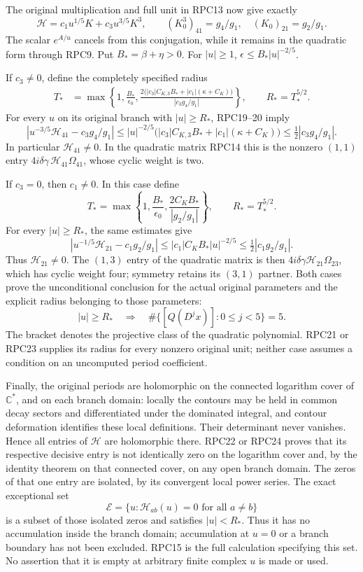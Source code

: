 \documentclass[11pt,a4paper]{article}
\begin{document}
The original multiplication and full unit in RPC13 now give exactly
\[
 \mathcal H=c_1u^{1/5}K+c_3u^{3/5}K^3,
 \qquad (K_0^3)_{41}=g_4/g_1,\quad (K_0)_{21}=g_2/g_1.
 \tag{RPC20}
\]
The scalar $e^{A/u}$ cancels from this conjugation, while it remains
in the quadratic form through RPC9. Put $B_*=\beta+\eta>0$.
For $|u|\ge1$, $\epsilon\le B_*|u|^{-2/5}$.

If $c_3\ne0$, define the completely specified radius
\[
 \begin{split}
 T_*&=\max\left\{1,\frac{B_*}{\epsilon_0},
 \frac{2\bigl(|c_3|C_{K,3}B_*+|c_1|(\kappa+C_K)\bigr)}
 {|c_3g_4/g_1|}\right\},\qquad R_*=T_*^{5/2}.
 \end{split}
 \tag{RPC21}
\]
For every $u$ on its original branch with $|u|\ge R_*$,
RPC19--20 imply
\[
 \left|u^{-3/5}\mathcal H_{41}-c_3g_4/g_1\right|
 \le |u|^{-2/5}\bigl(|c_3|C_{K,3}B_*
                           +|c_1|(\kappa+C_K)\bigr)
 \le\tfrac12|c_3g_4/g_1|.
 \tag{RPC22}
\]
In particular $\mathcal H_{41}\ne0$. In the quadratic matrix
RPC14 this is the nonzero $(1,1)$ entry
$4i\delta\gamma\,\mathcal H_{41}\Omega_{41}$, whose cyclic
weight is two.

If $c_3=0$, then $c_1\ne0$. In this case define
\[
 T_* =\max\left\{1,\frac{B_*}{\epsilon_0},
                   \frac{2C_KB_*}{|g_2/g_1|}\right\},
 \qquad R_*=T_*^{5/2}.
 \tag{RPC23}
\]
For every $|u|\ge R_*$, the same estimates give
\[
 \left|u^{-1/5}\mathcal H_{21}-c_1g_2/g_1\right|
       \le |c_1|C_KB_*|u|^{-2/5}
       \le\tfrac12|c_1g_2/g_1|.
 \tag{RPC24}
\]
Thus $\mathcal H_{21}\ne0$. The $(1,3)$ entry of the quadratic
matrix is then $4i\delta\gamma\mathcal H_{21}\Omega_{23}$,
which has cyclic weight four; symmetry retains its $(3,1)$ partner.
Both cases prove the unconditional conclusion for the actual original
parameters and the explicit radius belonging to those parameters:
\[
 \boxed{\quad |u|\ge R_*\quad\Longrightarrow\quad
       \#\{[Q(D^jx)]:0\le j<5\}=5.\quad}
 \tag{RPC25}
\]
The bracket denotes the projective class of the quadratic polynomial.
RPC21 or RPC23 supplies its radius for every nonzero original unit;
neither case assumes a condition on an uncomputed period coefficient.

Finally, the original periods are holomorphic on the connected
logarithm cover of $\mathbb C^*$, and on each branch domain: locally the contours may
be held in common decay sectors and differentiated under the dominated
integral, and contour deformation identifies these local definitions.
Their determinant never vanishes. Hence all entries of $\mathcal H$
are holomorphic there. RPC22 or RPC24 proves that its respective
decisive entry is not identically zero on the logarithm cover and,
by the identity theorem on that connected cover, on any open branch domain. The zeros
of that one entry are isolated, by its convergent local power series.
The exact exceptional set
\[
 \mathcal E=\{u:\mathcal H_{ab}(u)=0\text{ for all }a\ne b\}
 \tag{RPC26}
\]
is a subset of those isolated zeros and satisfies $|u|<R_*$.
Thus it has no accumulation inside the branch domain; accumulation
at $u=0$ or a branch boundary has not been excluded. RPC15 is the
full calculation specifying this set. No assertion that it is empty
at arbitrary finite complex $u$ is made or used.
\end{document}
